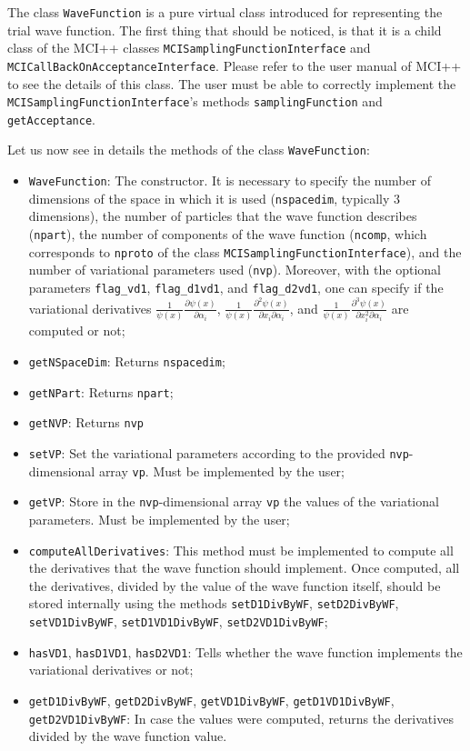 \documentclass[11pt,a4paper,twoside]{article}
\begin{document}
The class \verb+WaveFunction+ is a pure virtual class introduced for representing the trial wave function.
The first thing that should be noticed, is that it is a child class of the MCI++ classes \verb+MCISamplingFunctionInterface+ and \verb+MCICallBackOnAcceptanceInterface+.
Please refer to the user manual of MCI++ to see the details of this class.
The user must be able to correctly implement the \verb+MCISamplingFunctionInterface+'s methods \verb+samplingFunction+ and \verb+getAcceptance+.

Let us now see in details the methods of the class \verb+WaveFunction+:
\begin{itemize}
\item \verb+WaveFunction+: The constructor. It is necessary to specify the number of dimensions of the space in which it is used (\verb+nspacedim+, typically $3$ dimensions), the number of particles that the wave function describes (\verb+npart+), the number of components of the wave function (\verb+ncomp+, which corresponds to \verb+nproto+ of the class \verb+MCISamplingFunctionInterface+), and the number of variational parameters used (\verb+nvp+). Moreover, with the optional parameters \verb+flag_vd1+, \verb+flag_d1vd1+, and \verb+flag_d2vd1+, one can specify if the variational derivatives $\frac{1}{\psi(x)} \frac{\partial \psi(x)}{\partial \alpha_{i}}$, $\frac{1}{\psi(x)} \frac{\partial^2 \psi(x)}{\partial x_i \partial \alpha_{i}}$, and $\frac{1}{\psi(x)} \frac{\partial^3 \psi(x)}{\partial x_i^2 \partial \alpha_{i}}$ are computed or not;
\item \verb+getNSpaceDim+: Returns \verb+nspacedim+;
\item \verb+getNPart+: Returns \verb+npart+;
\item \verb+getNVP+: Returns \verb+nvp+
\item \verb+setVP+: Set the variational parameters according to the provided \verb+nvp+-dimensional array \verb+vp+. Must be implemented by the user;
\item \verb+getVP+: Store in the \verb+nvp+-dimensional array \verb+vp+ the values of the variational parameters. Must be implemented by the user;
\item \verb+computeAllDerivatives+: This method must be implemented to compute all the derivatives that the wave function should implement. Once computed, all the derivatives, divided by the value of the wave function itself, should be stored internally using the methods \verb+setD1DivByWF+, \verb+setD2DivByWF+, \verb+setVD1DivByWF+, \verb+setD1VD1DivByWF+, \verb+setD2VD1DivByWF+;
\item \verb+hasVD1+, \verb+hasD1VD1+, \verb+hasD2VD1+: Tells whether the wave function implements the variational derivatives or not;
\item \verb+getD1DivByWF+, \verb+getD2DivByWF+, \verb+getVD1DivByWF+, \verb+getD1VD1DivByWF+, \verb+getD2VD1DivByWF+: In case the values were computed, returns the derivatives divided by the wave function value.
\end{itemize}
\end{document}
